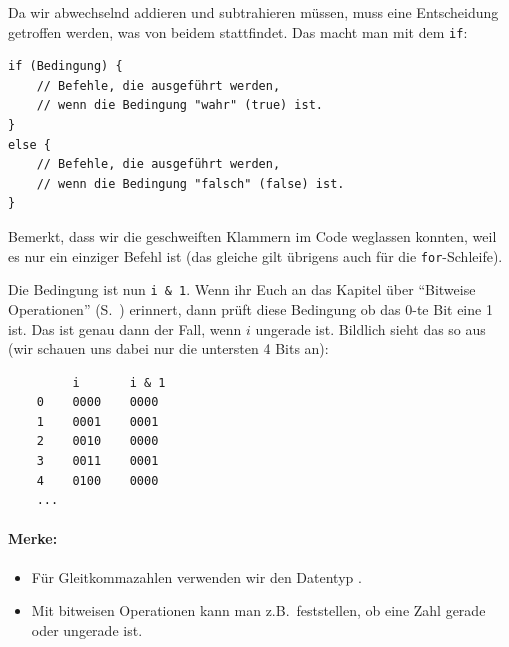 \begin{description}
    Da wir abwechselnd addieren und subtrahieren müssen, muss eine Entscheidung getroffen werden, was von beidem stattfindet. Das macht man mit dem \texttt{if}:
\begin{verbatim}
if (Bedingung) {
    // Befehle, die ausgeführt werden, 
    // wenn die Bedingung "wahr" (true) ist.
}
else {
    // Befehle, die ausgeführt werden, 
    // wenn die Bedingung "falsch" (false) ist.
}
\end{verbatim}
    Bemerkt, dass wir die geschweiften Klammern im Code weglassen konnten, weil es nur ein einziger Befehl ist
    (das gleiche gilt übrigens auch für die \texttt{for}-Schleife).

    Die Bedingung ist nun \texttt{i \& 1}. Wenn ihr Euch an das Kapitel über ``Bitweise Operationen'' (S.~\pageref{sec:grundlagen:bitweise-operationen}) erinnert, dann prüft diese Bedingung ob das 0-te Bit eine 1 ist. Das ist genau dann der Fall, wenn $i$ ungerade ist.
    Bildlich sieht das so aus (wir schauen uns dabei nur die untersten 4 Bits an):
\begin{verbatim}
         i       i & 1
    0    0000    0000
    1    0001    0001
    2    0010    0000
    3    0011    0001
    4    0100    0000
    ...
\end{verbatim}

\end{description}

\paragraph{Merke:}

\begin{itemize}[noitemsep]
    \item Für Gleitkommazahlen verwenden wir den Datentyp .
    \item Mit bitweisen Operationen kann man z.B.\ feststellen, ob eine Zahl gerade oder ungerade ist.
\end{itemize}
